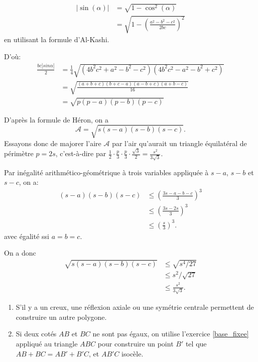 \begin{Soln}{74}
\begin{align*}
|\sin(\alpha)| &= \sqrt{1-\cos^2(\alpha)} \\
&= \sqrt{1-\left(\frac{a^2-b^2-c^2}{2bc}\right)^2}
\end{align*}
en utilisant la formule d'Al-Kashi.


D'où:
\begin{align*}
\frac{bc|sin\alpha|}{2} &= \frac{1}{4}\sqrt{(4b^2c^2+a^2-b^2-c^2)(4b^2c^2-a^2-b^2+c^2)} \\
&= \sqrt{\frac{(a+b+c)(b+c-a)(a-b+c)(a+b-c)}{16}}\\
&= \sqrt{p(p-a)(p-b)(p-c)}
\end{align*}
\end{Soln}
\begin{Soln}{75}
D'après la formule de Héron, on a
\[ \mathcal A = \sqrt{s(s-a)(s-b)(s-c)}.\]
Essayons donc de majorer l'aire $\mathcal A$ par l'air qu'aurait un triangle équilatéral de périmètre $p=2s$, c'est-à-dire par $\frac12 \cdot \frac{p}{3}\cdot\frac{p}{3}\cdot \frac{\sqrt 3}{2} = \frac{s^2}{3\sqrt 3}$.

Par inégalité arithmético-géométrique à trois variables appliquée à $s-a$, $s-b$ et $s-c$, on a:
\begin{align*}
(s-a)(s-b)(s-c)
&\leq (\frac{3s-a-b-c}{3})^3\\
&\leq (\frac{3s-2s}{3})^3\\
&\leq (\frac{s}{3})^3.
\end{align*}
avec égalité ssi $a=b=c$.

On a donc
\begin{align*}
\sqrt{s(s-a)(s-b)(s-c)}
&\leq \sqrt{s^4/27} \\
&\leq  s^2/\sqrt{27}\\
&\leq \frac{s^2}{3\sqrt 3}.
\end{align*}

\end{Soln}
\begin{Soln}{76}
\begin{enumerate}
\item S'il y a un creux, une réflexion axiale ou une symétrie centrale permettent de construire un autre polygone.
\item Si deux cotés $AB$ et $BC$ ne sont pas égaux, on utilise l'exercice \ref{base_fixee} appliqué au triangle $ABC$ pour construire un point $B'$ tel que $AB+BC = AB'+B'C$, et $AB'C$ isocèle.
\end{enumerate}
\end{Soln}
